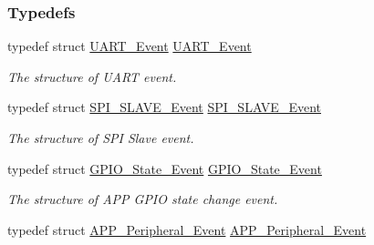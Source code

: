 \subsubsection*{Typedefs}
\begin{DoxyCompactItemize}
\item 
typedef struct \hyperlink{struct_u_a_r_t___event}{U\+A\+R\+T\+\_\+\+Event} \hyperlink{group___a_p_p___p_e_r_i_p_h_e_r_a_l_ga87049eb9c43148bc9be0a71d52532b1d}{U\+A\+R\+T\+\_\+\+Event}\hypertarget{group___a_p_p___p_e_r_i_p_h_e_r_a_l_ga87049eb9c43148bc9be0a71d52532b1d}{}\label{group___a_p_p___p_e_r_i_p_h_e_r_a_l_ga87049eb9c43148bc9be0a71d52532b1d}

\begin{DoxyCompactList}\small\item\em The structure of U\+A\+RT event. \end{DoxyCompactList}\item 
typedef struct \hyperlink{struct_s_p_i___s_l_a_v_e___event}{S\+P\+I\+\_\+\+S\+L\+A\+V\+E\+\_\+\+Event} \hyperlink{group___a_p_p___p_e_r_i_p_h_e_r_a_l_ga96d6333fd15bbcc0691c6b0860791810}{S\+P\+I\+\_\+\+S\+L\+A\+V\+E\+\_\+\+Event}\hypertarget{group___a_p_p___p_e_r_i_p_h_e_r_a_l_ga96d6333fd15bbcc0691c6b0860791810}{}\label{group___a_p_p___p_e_r_i_p_h_e_r_a_l_ga96d6333fd15bbcc0691c6b0860791810}

\begin{DoxyCompactList}\small\item\em The structure of S\+PI Slave event. \end{DoxyCompactList}\item 
typedef struct \hyperlink{struct_g_p_i_o___state___event}{G\+P\+I\+O\+\_\+\+State\+\_\+\+Event} \hyperlink{group___a_p_p___p_e_r_i_p_h_e_r_a_l_gafed5f27805659696a066ca34ce5667ce}{G\+P\+I\+O\+\_\+\+State\+\_\+\+Event}\hypertarget{group___a_p_p___p_e_r_i_p_h_e_r_a_l_gafed5f27805659696a066ca34ce5667ce}{}\label{group___a_p_p___p_e_r_i_p_h_e_r_a_l_gafed5f27805659696a066ca34ce5667ce}

\begin{DoxyCompactList}\small\item\em The structure of A\+PP G\+P\+IO state change event. \end{DoxyCompactList}\item 
typedef struct \hyperlink{struct_a_p_p___peripheral___event}{A\+P\+P\+\_\+\+Peripheral\+\_\+\+Event} \hyperlink{group___a_p_p___p_e_r_i_p_h_e_r_a_l_ga35d158b2b94ee384db3fd30484109f7a}{A\+P\+P\+\_\+\+Peripheral\+\_\+\+Event}\hypertarget{group___a_p_p___p_e_r_i_p_h_e_r_a_l_ga35d158b2b94ee384db3fd30484109f7a}{}\label{group___a_p_p___p_e_r_i_p_h_e_r_a_l_ga35d158b2b94ee384db3fd30484109f7a}


\end{DoxyCompactItemize}
